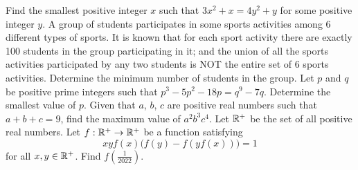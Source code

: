 \begin{enumerate}
\begin{center}
    \end{center}
    \hyperrefitem[A::2022-O-1-21] Find the smallest positive integer $x$ such that $3x^2 + x = 4y^2 + y$ for some positive integer $y$.
    \hyperrefitem[A::2022-O-1-22] A group of students participates in some sports activities among 6 different types of sports. It is known that for each sport activity there are exactly 100 students in the group participating in it; and the union of all the sports activities participated by any two students is NOT the entire set of 6 sports activities. Determine the minimum number of students in the group.
    \hyperrefitem[A::2022-O-1-23] Let $p$ and $q$ be positive prime integers such that $p^3 - 5p^2 - 18p = q^9 - 7q$. Determine the smallest value of $p$.
    \hyperrefitem[A::2022-O-1-24] Given that $a$, $b$, $c$ are positive real numbers such that $a + b + c = 9$, find the maximum value of $a^2 b^3 c^4$.
    \hyperrefitem[A::2022-O-1-25] Let $\mathbb{R}^+$ be the set of all positive real numbers. Let $f : \mathbb{R}^+ \to \mathbb{R}^+$ be a function satisfying \[xy f(x) \big(f(y) - f(yf(x))\big) = 1\] for all $x, y \in \mathbb{R}^+$. Find $f(\frac1{2022})$.
\end{enumerate}